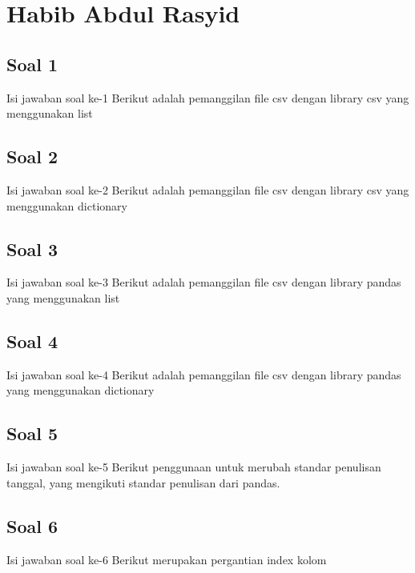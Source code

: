 



\section{Habib Abdul Rasyid}
\subsection{Soal 1}
Isi jawaban soal ke-1
Berikut adalah pemanggilan file csv dengan library csv yang menggunakan list
    
\subsection{Soal 2}
Isi jawaban soal ke-2
Berikut adalah pemanggilan file csv dengan library csv yang menggunakan dictionary
    
\subsection{Soal 3}
Isi jawaban soal ke-3
Berikut adalah pemanggilan file csv dengan library pandas yang menggunakan list
    
\subsection{Soal 4}
Isi jawaban soal ke-4
 Berikut adalah pemanggilan file csv dengan library pandas yang menggunakan dictionary
    
\subsection{Soal 5}
Isi jawaban soal ke-5
 Berikut penggunaan untuk merubah standar penulisan tanggal, yang mengikuti standar penulisan dari pandas.
    
\subsection{Soal 6}
Isi jawaban soal ke-6
 Berikut merupakan pergantian index kolom
    
